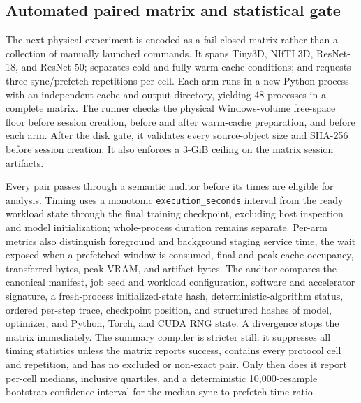 \subsection{Automated paired matrix and statistical gate}

The next physical experiment is encoded as a fail-closed matrix rather than a
collection of manually launched commands. It spans Tiny3D, NIfTI 3D,
ResNet-18, and ResNet-50; separates cold and fully warm cache conditions; and
requests three sync/prefetch repetitions per cell. Each arm runs in a new
Python process with an independent cache and output directory, yielding 48
processes in a complete matrix. The runner checks the physical Windows-volume
free-space floor before session creation, before and after warm-cache
preparation, and before each arm. After the disk gate, it validates every
source-object size and SHA-256 before session creation. It also enforces a 3-GiB ceiling on the
matrix session artifacts.

Every pair passes through a semantic auditor before its times are eligible for
analysis. Timing uses a monotonic \texttt{execution\_seconds} interval from
the ready workload state through the final training checkpoint, excluding host
inspection and model initialization; whole-process duration remains separate.
Per-arm metrics also distinguish foreground and background staging service time,
the wait exposed when a prefetched window is consumed, final and peak cache
occupancy, transferred bytes, peak VRAM, and artifact bytes.
The auditor compares the canonical manifest, job seed and workload
configuration, software and accelerator signature, a fresh-process
initialized-state hash, deterministic-algorithm status, ordered per-step trace,
checkpoint position, and structured hashes of model, optimizer, and Python,
Torch, and CUDA RNG state. A divergence stops the matrix immediately. The
summary compiler is stricter still: it suppresses all timing statistics unless
the matrix reports success, contains every protocol cell and repetition, and
has no excluded or non-exact pair. Only then does it report per-cell medians,
inclusive quartiles, and a deterministic 10,000-resample bootstrap confidence
interval for the median sync-to-prefetch time ratio.


